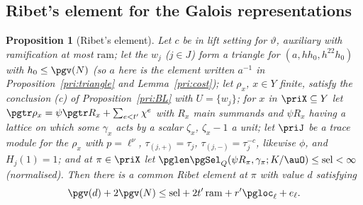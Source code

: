 \documentclass[10pt]{amsart}
\newtheorem{proposition}[theorem]{Proposition}
\theoremstyle{definition}
\theoremstyle{remark}
\begin{document}
\subsection{Ribet's element for the Galois representations}\label{pri:ss-columns}

\begin{proposition}[Ribet's element]\label{pri:columns}
Let $c$ be in lift setting for $\vartheta$, auxiliary with ramification at most $\mathrm{ram}$;
let the $w_j$ ($j\in J$) form a triangle for $(a,hh_0,h^{22}h_0)$ with $h_0\le\pgv(N)$ (so $a$ here
is the element written $a^{-1}$ in Proposition~\ref{pri:triangle} and Lemma~\ref{pri:cost}); let
$\rho_x$, $x\in Y$ finite, satisfy the conclusion (c) of Proposition~\ref{pri:BL} with $U=\{w_j\}$;
for $x$ in $\priX\subseteq Y$ let $\pgtr\rho_x=\psi\pgtr R_x+\sum_{e<t'}\chi^e$ with $R_x$ main summands
and $\psi R_x$ having a lattice on which some $\gamma_x$ acts by a scalar $\zeta_x$, $\zeta_x-1$ a
unit; let $\priJ$ be a trace module for the $\rho_x$ with $p=\ell^\nu$, $\tau_{(j,+)}=\tau_j$,
$\tau_{(j,-)}=\tau_j^{-c}$, likewise $\phi$, and $H_j(1)=1$; and at $\pi\in\priX$ let $\pglen
\pgSel_Q(\psi R_\pi,\gamma_\pi;K/\auO)\le\mathrm{sel}<\infty$ (normalised). Then there is a common Ribet
element at $\pi$ with value $d$ satisfying
\[
\pgv(d)+2\pgv(N)\le\mathrm{sel}+2t'\,\mathrm{ram}+r'\pgloc_\ell+e_\ell .
\]
\end{proposition}
\end{document}
